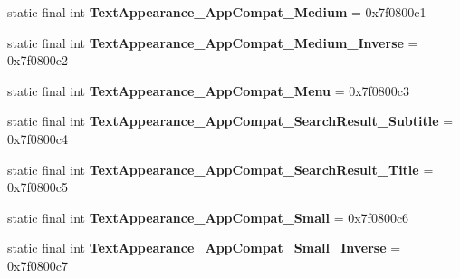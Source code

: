 \begin{DoxyCompactItemize}
\item 
\hypertarget{classandroid_1_1support_1_1design_1_1_r_1_1style_a6f36f3944c8c9e72bb28b1b6f6f55a08}{}static final int {\bfseries Text\+Appearance\+\_\+\+App\+Compat\+\_\+\+Medium} = 0x7f0800c1\label{classandroid_1_1support_1_1design_1_1_r_1_1style_a6f36f3944c8c9e72bb28b1b6f6f55a08}

\item 
\hypertarget{classandroid_1_1support_1_1design_1_1_r_1_1style_afedf82a346a4efa74ea8c629e33ca220}{}static final int {\bfseries Text\+Appearance\+\_\+\+App\+Compat\+\_\+\+Medium\+\_\+\+Inverse} = 0x7f0800c2\label{classandroid_1_1support_1_1design_1_1_r_1_1style_afedf82a346a4efa74ea8c629e33ca220}

\item 
\hypertarget{classandroid_1_1support_1_1design_1_1_r_1_1style_ac915ed93a55ceecfd2cab0a8274bec5c}{}static final int {\bfseries Text\+Appearance\+\_\+\+App\+Compat\+\_\+\+Menu} = 0x7f0800c3\label{classandroid_1_1support_1_1design_1_1_r_1_1style_ac915ed93a55ceecfd2cab0a8274bec5c}

\item 
\hypertarget{classandroid_1_1support_1_1design_1_1_r_1_1style_aa74ef0db689e7a9ca4d8eb5bb6ddb39f}{}static final int {\bfseries Text\+Appearance\+\_\+\+App\+Compat\+\_\+\+Search\+Result\+\_\+\+Subtitle} = 0x7f0800c4\label{classandroid_1_1support_1_1design_1_1_r_1_1style_aa74ef0db689e7a9ca4d8eb5bb6ddb39f}

\item 
\hypertarget{classandroid_1_1support_1_1design_1_1_r_1_1style_ac1981951ceed0b51f02c35a709d05b59}{}static final int {\bfseries Text\+Appearance\+\_\+\+App\+Compat\+\_\+\+Search\+Result\+\_\+\+Title} = 0x7f0800c5\label{classandroid_1_1support_1_1design_1_1_r_1_1style_ac1981951ceed0b51f02c35a709d05b59}

\item 
\hypertarget{classandroid_1_1support_1_1design_1_1_r_1_1style_ad01c4cdfcd6c9c59bf080f594be9a5fe}{}static final int {\bfseries Text\+Appearance\+\_\+\+App\+Compat\+\_\+\+Small} = 0x7f0800c6\label{classandroid_1_1support_1_1design_1_1_r_1_1style_ad01c4cdfcd6c9c59bf080f594be9a5fe}

\item 
\hypertarget{classandroid_1_1support_1_1design_1_1_r_1_1style_a51c0b2630a053741b47b8c2809e85733}{}static final int {\bfseries Text\+Appearance\+\_\+\+App\+Compat\+\_\+\+Small\+\_\+\+Inverse} = 0x7f0800c7\label{classandroid_1_1support_1_1design_1_1_r_1_1style_a51c0b2630a053741b47b8c2809e85733}


\end{DoxyCompactItemize}
